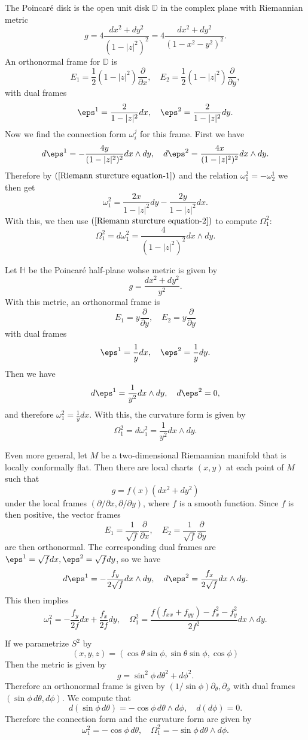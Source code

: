 \begin{example}
The Poincar\'e disk is the open unit disk $\mathbb{D}$ in the complex plane with Riemannian metric
\[g=4\frac{dx^2+dy^2}{(1-|z|^2)^2}=4\frac{dx^2+dy^2}{(1-x^2-y^2)^2}.\]
An orthonormal frame for $\mathbb{D}$ is
\[E_1=\frac{1}{2}(1-|z|^2)\frac{\partial}{\partial x},\quad E_2=\frac{1}{2}(1-|z|^2)\frac{\partial}{\partial y},\]
with dual frames
\[\eps^1=\frac{2}{1-|z|^2}dx,\quad \eps^2=\frac{2}{1-|z|^2}dy.\]
Now we find the connection form $\omega_i^j$ for this frame. First we have
\[d\eps^1=-\frac{4y}{(1-|z|^2)^2}dx\wedge dy,\quad d\eps^2=\frac{4x}{(1-|z|^2)^2}dx\wedge dy.\]
Therefore by $(\ref{Riemann sturcture equation-1})$ and the relation $\omega_1^2=-\omega_2^1$ we then get
\[\omega_1^2=\frac{2x}{1-|z|^2}dy-\frac{2y}{1-|z|^2}dx.\]
With this, we then use $(\ref{Riemann sturcture equation-2})$ to compute $\Omega_1^2$:
\[\Omega_1^2=d\omega_1^2=\frac{4}{(1-|z|^2)^2}dx\wedge dy.\]
\end{example}
\begin{example}
Let $\mathbb{H}$ be the Poincar\'e half-plane wohse metric is given by
\[g=\frac{dx^2+dy^2}{y^2}.\]
With this metric, an orthonormal frame is
\[E_1=y\frac{\partial}{\partial y},\quad E_2=y\frac{\partial}{\partial y}\]
with dual frames
\[\eps^1=\frac{1}{y}dx,\quad \eps^2=\frac{1}{y}dy.\]
Then we have
\[d\eps^1=\frac{1}{y^2}dx\wedge dy,\quad d\eps^2=0,\]
and therefore $\omega_1^2=\frac{1}{y}dx$. With this, the curvature form is given by
\[\Omega_1^2=d\omega_1^2=\frac{1}{y^2}dx\wedge dy.\]
\end{example}
\begin{example}
Even more general, let $M$ be a two-dimensional Riemannian manifold that is locally conformally flat. Then there are local charts $(x,y)$ at each point of $M$ such that
\[g=f(x)(dx^2+dy^2)\]
under the local frames $(\partial/\partial x,\partial/\partial y)$, where $f$ is a smooth function. Since $f$ is then positive, the vector frames
\[E_1=\frac{1}{\sqrt{f}}\frac{\partial}{\partial x},\quad E_2=\frac{1}{\sqrt{f}}\frac{\partial}{\partial y}\]
are then orthonormal. The corresponding dual frames are $\eps^1=\sqrt{f}dx,\eps^2=\sqrt{f}dy$, so we have
\[d\eps^1=-\frac{f_y}{2\sqrt{f}}dx\wedge dy,\quad d\eps^2=\frac{f_x}{2\sqrt{f}}dx\wedge dy.\]
This then implies
\[\omega_1^2=-\frac{f_y}{2f}dx+\frac{f_x}{2f}dy,\quad \Omega_1^2=\frac{f(f_{xx}+f_{yy})-f_x^2-f_y^2}{2f^2}dx\wedge dy.\]
\end{example}
\begin{example}
If we parametrize $S^2$ by
\[(x,y,z)=(\cos\theta\sin\phi,\sin\theta\sin\phi,\cos\phi)\]
Then the metric is given by
\[g=\sin^2\phi\,d\theta^2+d\phi^2.\]
Therefore an orthonormal frame is given by $(1/\sin\phi)\partial_\theta,\partial_\phi$ with dual frames $(\sin\phi\,d\theta,d\phi)$. We compute that
\[d(\sin\phi\,d\theta)=-\cos\phi\,d\theta\wedge d\phi,\quad d(d\phi)=0.\] 
Therefore the connection form and the curvature form are given by
\[\omega_1^2=-\cos\phi\,d\theta,\quad\Omega_1^2=-\sin\phi\,d\theta\wedge d\phi.\]
\end{example}
